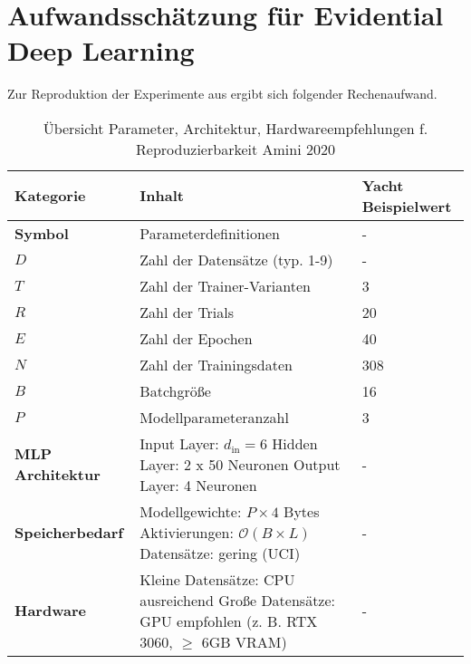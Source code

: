 \pagebreak

\section*{Aufwandsschätzung für Evidential Deep Learning}
\label{sec:aufwand-edl-amini}

Zur Reproduktion der Experimente aus \parencite{amini2020deep} ergibt sich folgender Rechenaufwand.

\begin{table}[!htbp]
  \centering
  \footnotesize
  \begin{tabularx}{\textwidth}{|l|X|X|}
    \hline
    \textbf{Kategorie} & \textbf{Inhalt} & \textbf{Yacht Beispielwert} \\
    \hline
    \textbf{Symbol} & Parameterdefinitionen & - \\
    \hline
    $D$ & Zahl der Datensätze (typ. 1-9) & - \\
    \hline
    $T$ & Zahl der Trainer-Varianten & 3 \\
    \hline
    $R$ & Zahl der Trials & 20 \\
    \hline
    $E$ & Zahl der Epochen & 40 \\
    \hline
    $N$ & Zahl der Trainingsdaten & 308 \\
    \hline
    $B$ & Batchgröße & 16 \\
    \hline
    $P$ & Modellparameteranzahl & 3 \\
    \hline
    \textbf{MLP Architektur} & Input Layer: $d_\text{in}=6$ \newline Hidden Layer: 2 x 50 Neuronen \newline Output Layer: 4 Neuronen & - \\
    \hline
    \textbf{Speicherbedarf} & Modellgewichte: $P \times 4$ Bytes \newline Aktivierungen: $\mathcal{O}(B \times L)$ \newline Datensätze: gering (UCI) & - \\
    \hline
    \textbf{Hardware} & Kleine Datensätze: CPU ausreichend \newline Große Datensätze: GPU empfohlen (z. B. RTX 3060, $\geq$ 6GB VRAM) & - \\
    \hline
  \end{tabularx}
  \caption{\footnotesize Übersicht Parameter, Architektur, Hardwareempfehlungen f. Reproduzierbarkeit Amini 2020}
  \label{tab:edl-gesamt}
\end{table}


\vspace{-0.5em}

